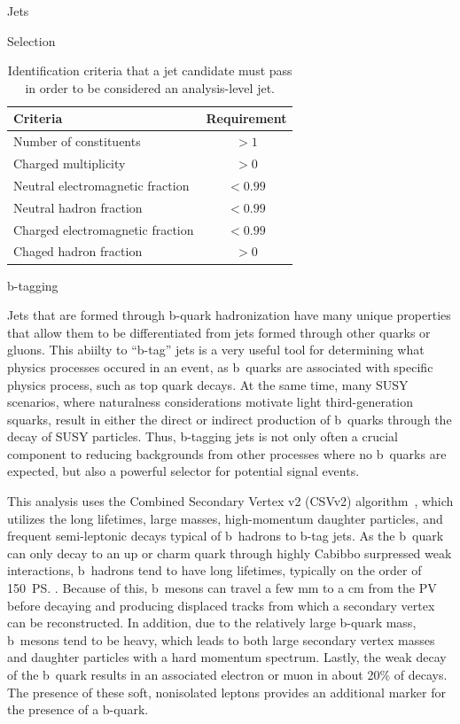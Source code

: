\begin{section}{Jets}
\begin{subsection}{Selection}
\begin{table}[tb!]
\centering
\begin{tabular}{l|c}
\hline \hline
Criteria                          &  Requirement \\
\hline
Number of constituents            &  $> 1$       \\
Charged multiplicity              &  $> 0$       \\
Neutral electromagnetic fraction  &  $< 0.99$    \\
Neutral hadron fraction           &  $< 0.99$    \\
Charged electromagnetic fraction  &  $< 0.99$    \\
Chaged hadron fraction            &  $> 0$       \\
\hline\hline
\end{tabular}
\caption{Identification criteria that a jet candidate must pass in order to be considered an analysis-level jet.}
\label{tab:jet_id}
\end{table}

\end{subsection}

\begin{subsection}{b-tagging}

Jets that are formed through b-quark hadronization have many unique properties that allow them to be differentiated from jets formed through other quarks or gluons.
This abiilty to ``b-tag'' jets is a very useful tool for determining what physics processes occured in an event, as b~quarks are associated with specific physics process, such as top quark decays.
At the same time, many SUSY scenarios, where naturalness considerations motivate light third-generation squarks, result in either the direct or indirect production of b~quarks through the decay of SUSY particles.
Thus, b-tagging jets is not only often a crucial component to reducing backgrounds from other processes where no b~quarks are expected, but also a powerful selector for potential signal events. 

This analysis uses the Combined Secondary Vertex v2 (CSVv2) algorithm~\cite{Chatrchyan:2012jua,Sirunyan:2017ezt}, which utilizes the long lifetimes, large masses, high-momentum daughter particles, and frequent semi-leptonic decays typical of b~hadrons to b-tag jets.
As the b~quark can only decay to an up or charm quark through highly Cabibbo surpressed weak interactions, b~hadrons tend to have long lifetimes, typically on the order of 150~\ps.
Because of this, b~mesons can travel a few mm to a cm from the PV before decaying and producing displaced tracks from which a secondary vertex can be reconstructed.
In addition, due to the relatively large b-quark mass, b~mesons tend to be heavy, which leads to both large secondary vertex masses and daughter particles with a hard momentum spectrum.
Lastly, the weak decay of the b~quark results in an associated electron or muon in about 20\% of decays.
The presence of these soft, nonisolated leptons provides an additional marker for the presence of a b-quark.


\end{subsection}
\end{section}
